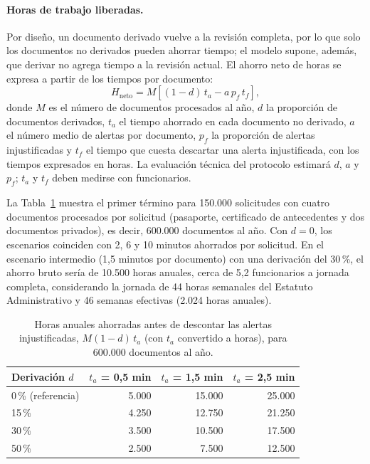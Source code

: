 \documentclass[11pt,a4paper]{article}
\begin{document}
\paragraph{Horas de trabajo liberadas.}
Por diseño, un documento derivado vuelve a la revisión completa, por lo que solo los documentos no derivados pueden ahorrar tiempo; el modelo supone, además, que derivar no agrega tiempo a la revisión actual. El ahorro neto de horas se expresa a partir de los tiempos por documento:
\[
H_{\mathrm{neto}} = M \left[ (1-d)\, t_{a} - a \, p_{f} \, t_{f} \right],
\]
donde $M$ es el número de documentos procesados al año, $d$ la proporción de documentos derivados, $t_{a}$ el tiempo ahorrado en cada documento no derivado, $a$ el número medio de alertas por documento, $p_{f}$ la proporción de alertas injustificadas y $t_{f}$ el tiempo que cuesta descartar una alerta injustificada, con los tiempos expresados en horas. La evaluación técnica del protocolo estimará $d$, $a$ y $p_f$; $t_a$ y $t_f$ deben medirse con funcionarios.

La Tabla~\ref{tab:sensibilidad} muestra el primer término para 150.000 solicitudes con cuatro documentos procesados por solicitud (pasaporte, certificado de antecedentes y dos documentos privados), es decir, 600.000 documentos al año. Con $d = 0$, los escenarios coinciden con 2, 6 y 10 minutos ahorrados por solicitud. En el escenario intermedio (1,5 minutos por documento) con una derivación del 30\,\%, el ahorro bruto sería de 10.500 horas anuales, cerca de 5,2 funcionarios a jornada completa, considerando la jornada de 44 horas semanales del Estatuto Administrativo \cite{estatuto} y 46 semanas efectivas (2.024 horas anuales).

\begin{table}[!htbp]
\centering
\caption{Horas anuales ahorradas antes de descontar las alertas injustificadas, $M (1-d)\, t_a$ (con $t_a$ convertido a horas), para 600.000 documentos al año.}
\label{tab:sensibilidad}
\small
\begin{tabular}{lrrr}
\toprule
\textbf{Derivación $d$} & \textbf{$t_a$ = 0,5 min} & \textbf{$t_a$ = 1,5 min} & \textbf{$t_a$ = 2,5 min} \\
\midrule
0\,\% (referencia) & 5.000 & 15.000 & 25.000 \\
15\,\% & 4.250 & 12.750 & 21.250 \\
30\,\% & 3.500 & 10.500 & 17.500 \\
50\,\% & 2.500 & 7.500 & 12.500 \\
\bottomrule
\end{tabular}
\end{table}
\end{document}
